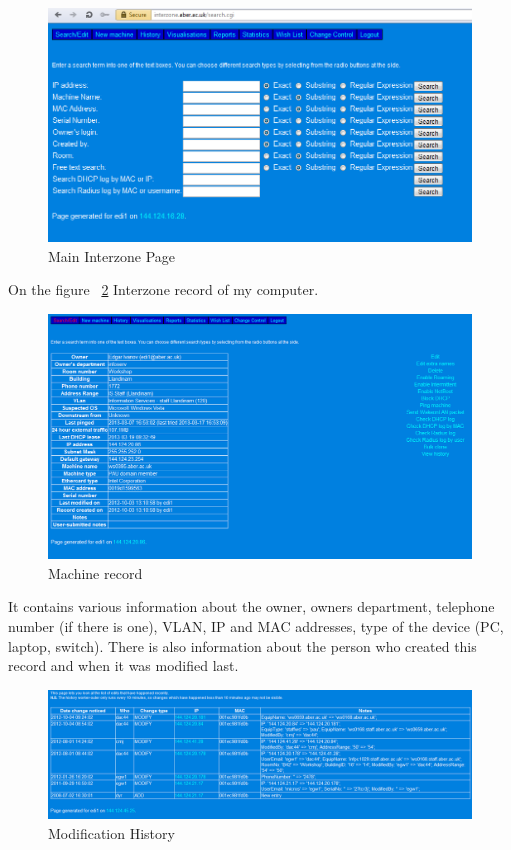 \documentclass[10pt,a4paper,headinclude=true,twoside]{report}
\begin{document}
\begin{figure}[H]
\centering
\centerline{\includegraphics[scale=0.5]{./main_interzone_page}}
\caption{Main Interzone Page}
\label{fig:main_interzone_page}
\end{figure}

On the figure ~\ref{fig:machine_record} Interzone record of my computer.

\begin{figure}[H]
\centering
\centerline{\includegraphics[scale=0.5]{./machine_record}}
\caption{Machine record}
\label{fig:machine_record}
\end{figure}

It contains various information about the owner, owners department, telephone number (if there is one), VLAN, IP and MAC addresses, type of the device (PC, laptop, switch). There is also information about the person who created this record and when it was modified last.

\begin{figure}[H]
\centering
\centerline{\includegraphics[scale=0.5]{./modification_history}}
\caption{Modification History}
\label{fig:modification_history}
\end{figure}
\end{document}
